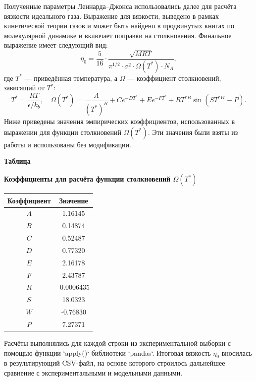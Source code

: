 \documentclass[a4paper,12pt]{article}
\newcommand{\TableNumberRight}{
  \refstepcounter{table}%
  \noindent\hfill\textbf{Таблица \thetable}
}
\begin{document}
      Полученные параметры Леннарда--Джонса использовались далее для расчёта вязкости идеального газа. Выражение для вязкости, выведено в рамках кинетической теории газов и может быть найдено в продвинутых книгах по молекулярной динамике \cite{molecular1955theory}и включает поправки на столкновения. Финальное выражение имеет следующий вид:
      \[
      \eta_0 = \frac{5}{16} \cdot \frac{\sqrt{MRT}}{\pi^{1/2} \cdot \sigma^2 \cdot \Omega(T^*) \cdot N_A},
      \]
      где $T^*$ — приведённая температура, а $\Omega$ — коэффициент столкновений, зависящий от $T^*$:
      \[
      T^* = \frac{RT}{\epsilon/k_b}, \quad
      \Omega(T^*) = \frac{A}{(T^*)^B} + C e^{-D T^*} + E e^{-F T^*} + R T^{*B} \sin(S T^{*W} - P).
      \]
      Ниже приведены значения эмпирических коэффициентов, использованных в выражении для функции столкновений $\Omega(T^*)$. Эти значения были взяты из работы \cite{neufeld1972collision} и использованы без модификации.
      \begin{table}[ht]
        \TableNumberRight
        \begin{center}
          \textbf{Коэффициенты для расчёта функции столкновений $\Omega(T^*)$}
          \vspace*{\fill}
        \end{center}
      
        \vspace{0.8ex}
        \noindent
        \begin{tabular}{|c|S|}
          \hline
          \textbf{Коэффициент} & {\textbf{Значение}} \\
          \hline
          $A$ & 1.16145 \\
          $B$ & 0.14874 \\
          $C$ & 0.52487 \\
          $D$ & 0.77320 \\
          $E$ & 2.16178 \\
          $F$ & 2.43787 \\
          $R$ & -0.0006435 \\
          $S$ & 18.0323 \\
          $W$ & -0.76830 \\
          $P$ & 7.27371 \\
          \hline
        \end{tabular}
        \label{tab:neufeld_coeffs}
      \end{table}

      
      Расчёты выполнялись для каждой строки из экспериментальной выборки с помощью функции `apply()` библиотеки `pandas`. Итоговая вязкость $\eta_0$ вносилась в результирующий CSV-файл, на основе которого строилось дальнейшее сравнение с экспериментальными и модельными данными.      
      
\end{document}
